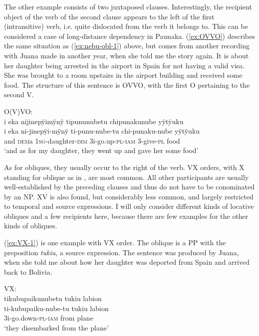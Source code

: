 The other example consists of two juxtaposed clauses. Interestingly, the recipient object of the verb of the second clause appears to the left of the first (intransitive) verb, i.e. quite dislocated from the verb it belongs to. This can be considered a case of long-distance dependency in Paunaka. (\ref{ex:OVVO}) describes the same situation as (\ref{ex:nebu-obl-1}) above, but comes from another recording with Juana made in another year, when she told me the story again. It is about her daughter being arrested in the airport in Spain for not having a valid visa. She was brought to a room upstairs in the airport building and received some food. The structure of this sentence is OVVO, with the first O pertaining to the second V.

\ea\label{ex:OVVO}
\begingl
\glpreamble \textup{O(V)VO:}\\i eka nijinepÿimÿnÿ tipununubetu chipunakunube yÿtÿuku\\
\gla i eka ni-jinepÿi-mÿnÿ ti-punu-nube-tu chi-punaku-nube yÿtÿuku\\
\glb and \textsc{dem}a 1\textsc{sg}-daughter-\textsc{dim} 3i-go.up-\textsc{pl}-\textsc{iam} 3-give-\textsc{pl} food\\
\glft ‘and as for my daughter, they went up and gave her some food’
\endgl
\trailingcitation{[jxx-p120430l-1.213]}
\xe


As for obliques, they usually occur to the right of the verb. VX orders, with X standing for oblique as in \citet[]{wals-84}, are most common. All other participants are usually well-established by the preceding clauses and thus do not have to be conominated by an NP. XV is also found, but considerably less common, and largely restricted to temporal and source expressions. I will only consider different kinds of locative obliques and a few recipients here, because there are few examples for the other kinds of obliques. 

(\ref{ex:VX-1}) is one example with VX order. The oblique is a PP with the preposition \textit{tukiu}, a source expression. The sentence was produced by Juana, when she told me about how her daughter was deported from Spain and arrived back to Bolivia.

\ea\label{ex:VX-1}
\begingl
\glpreamble \textup{VX:}\\tikubupaikunubetu tukiu labion\\
\gla ti-kubupaiku-nube-tu tukiu labion\\
\glb 3i-go.down-\textsc{pl}-\textsc{iam} from plane\\
\glft ‘they disembarked from the plane’
\endgl
\trailingcitation{[jxx-p120430l-1.266]}
\xe

